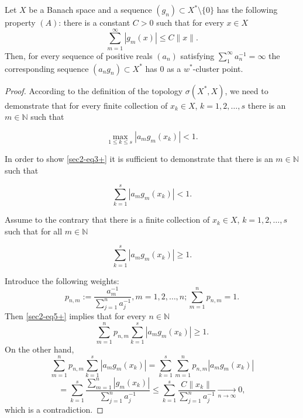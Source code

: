 \documentclass[10pt,a4paper]{amsart}
\newcommand{\N}{{\mathbb N}}
\begin{document}
\begin{lemma}  \label{lem1}
Let $X$ be a Banach space and a sequence $(g_n) \subset X^*\setminus \{0\}$ has the following property $(A)$:  there is a constant $C>0$ such that for every $x \in X$
$$
\sum_{m=1}^\infty \left|g_m(x) \right| \le C \|x\|.
$$
Then, for every sequence of positive reals $(a_n)$ satisfying $\sum_1^\infty a_n^{-1}=\infty$ the corresponding sequence  $(a_n g_n) \subset X^*$ has 0 as a $w^*$-cluster point.
\end{lemma}

\begin{proof}

According to the definition of the topology $\sigma(X^*, X)$, we need to demonstrate that for every finite collection of  $x_k \in X$, $k=1, 2,\ldots,s$ there is an $m \in \N$ such that

\begin{equation} \label{sec2-eq3+}
\max_{1\le k \le s} \left| a_m g_m(x_k)  \right| <1. 
\end{equation}

In order to show \eqref{sec2-eq3+} it is sufficient to demonstrate that   
there is an $m \in \N$ such that


\begin{equation*} \label{sec2-eq4+}
\sum_{ k = 1}^s \left|  a_m g_m(x_k) \right| <1. 
\end{equation*}

Assume to the contrary that there is a finite collection of  $x_k \in X$, $k=1, 2,\ldots,s$ such that for all $m \in \N$

\begin{equation} \label{sec2-eq5+}
\sum_{ k = 1}^s \left|  a_m g_m(x_k) \right| \ge 1. 
\end{equation}

Introduce the following weights:
$$
p_{n,m}:=\frac{a_m^{-1}}{\sum_{j=1}^n a_j^{-1}}, m=1,2, \ldots, n; \sum_{m=1}^n p_{n,m} =1.
$$
Then \eqref{sec2-eq5+} implies that for every $n \in \N$
$$
\sum_{m=1}^n p_{n,m} \sum_{ k = 1}^s \left|  a_m g_m(x_k) \right| \ge 1. 
$$
On the other hand,
$$
\sum_{m=1}^n p_{n,m} \sum_{ k = 1}^s \left|  a_m g_m(x_k) \right| =  \sum_{ k = 1}^s\sum_{m=1}^n p_{n,m} \left|  a_m g_m(x_k) \right|  
$$
$$
=  \sum_{ k = 1}^s\frac{\sum_{m=1}^n
\left| g_m(x_k) \right|}{\sum_{j=1}^n a_j^{-1}} \le  \sum_{ k = 1}^s\frac{C\|x_k\|}{\sum_{j=1}^n a_j^{-1}} \xrightarrow[ n \to \infty]{} 0,
$$
which is a contradiction.
\end{proof}
\end{document}

